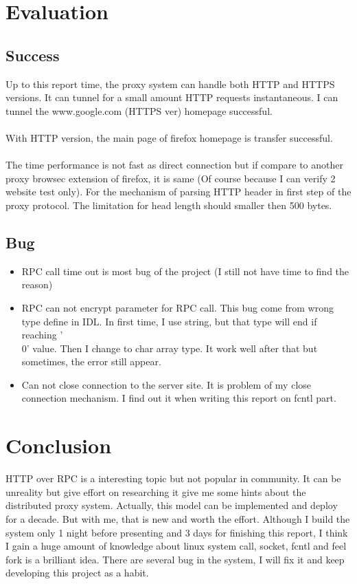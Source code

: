 \documentclass{article}
\begin{document}
\section{Evaluation}
\subsection{Success}
Up to this report time, the proxy system can handle both HTTP and HTTPS versions.
It can tunnel for a small amount HTTP requests instantaneous. I can tunnel the
www.google.com (HTTPS ver) homepage successful.\\
\\
With HTTP version, the main page of firefox homepage is transfer successful.\\
\\
The time performance is not fast as direct connection but if compare to another proxy
browsec extension of firefox, it is same (Of course because I can verify 2 website test only).
For the mechanism of parsing HTTP header in first step of the proxy protocol. The limitation
for head length should smaller then 500 bytes.
\subsection{Bug}
\begin{itemize}
\item RPC call time out is most bug of the project (I still not have time to find the reason)
\item RPC can not encrypt parameter for RPC call. This bug come from wrong type define in IDL.
In first time, I use string, but that type will end if reaching '\\0' value. Then I change to
char array type. It work well after that but sometimes, the error still appear.
\item Can not close connection to the server site. It is problem of my close connection mechanism.
I find out it when writing this report on fcntl part.
\end{itemize}
\section{Conclusion}
HTTP over RPC is a interesting topic but not popular in community. It can be unreality but give
effort on researching it give me some hints about the distributed proxy system. Actually, this
model can be implemented and deploy for a decade. But with me, that is new and worth the effort.
Although I build the system only 1 night before presenting and 3 days for finishing this report,
I think I gain a huge amount of knowledge about linux system call, socket, fcntl and feel fork 
is a brilliant idea. There are several bug in the system, I will fix it and keep developing this
project as a habit.
\end{document}

